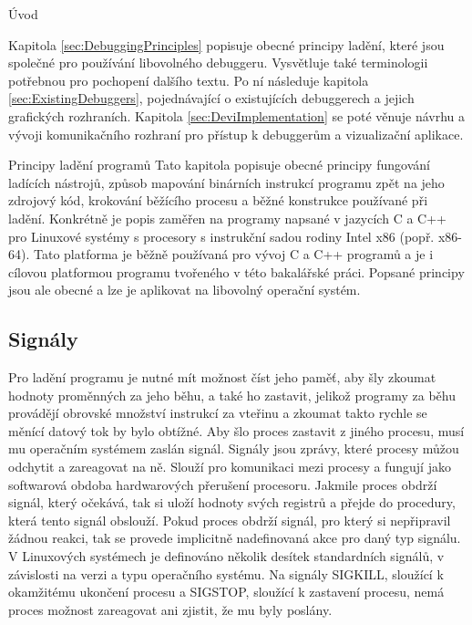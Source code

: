 \documentclass[czech,bachelor,male,python,dept460]{diploma}						%
\newcommand{\parspace}[1][]{
	\ifthenelse{\isempty{#1}}{\vspace{5mm}}{\vspace{#1}}
	\par
}
\begin{document}
\begin{section}{Úvod}
	\parspace Kapitola \ref{sec:DebuggingPrinciples} popisuje obecné principy ladění, které jsou společné pro používání libovolného debuggeru.
	Vysvětluje také terminologii potřebnou pro pochopení dalšího textu. Po ní následuje kapitola \ref{sec:ExistingDebuggers}, pojednávající o existujících
	debuggerech a jejich grafických rozhraních. Kapitola \ref{sec:DeviImplementation} se poté věnuje návrhu a vývoji komunikačního rozhraní pro přístup k debuggerům
	a vizualizační aplikace.
\end{section}
\begin{section}{Principy ladění programů}
\label{sec:DebuggingPrinciples}
	Tato kapitola popisuje obecné principy fungování ladících nástrojů, způsob mapování binárních instrukcí programu zpět na jeho zdrojový kód,
	krokování běžícího procesu a běžné konstrukce používané při ladění. Konkrétně je popis zaměřen na programy napsané v jazycích C a C++
	pro Linuxové systémy s procesory s instrukční sadou rodiny Intel x86 (popř. x86-64).
	Tato platforma je běžně používaná pro vývoj C a C++ programů a je i cílovou platformou programu tvořeného v této bakalářské práci.
	Popsané principy jsou ale obecné a lze je aplikovat na libovolný operační systém.
		
	\subsection{Signály}
		Pro ladění programu je nutné mít možnost číst jeho paměť, aby šly zkoumat hodnoty proměnných za jeho běhu, a také ho zastavit, jelikož
		programy za běhu provádějí obrovské množství instrukcí za vteřinu a zkoumat takto rychle se měnící datový tok by bylo obtížné.
		Aby šlo proces zastavit z jiného procesu, musí mu operačním systémem zaslán signál.
		Signály jsou zprávy, které procesy můžou odchytit a zareagovat na ně. \cite[21]{tanenbaum}
		Slouží pro komunikaci mezi procesy a fungují jako softwarová obdoba hardwarových přerušení procesoru.
		Jakmile proces obdrží signál, který očekává, tak si uloží hodnoty svých registrů a přejde do procedury, která tento signál obslouží.
		Pokud proces obdrží signál, pro který si nepřipravil žádnou reakci, tak se provede implicitně nadefinovaná akce pro daný typ signálu.
		V Linuxových systémech je definováno několik desítek standardních signálů, v závislosti na verzi a typu operačního systému.
		Na signály SIGKILL, sloužící k okamžitému ukončení procesu a SIGSTOP, sloužící k zastavení procesu, nemá proces možnost zareagovat ani
		zjistit, že mu byly poslány.
	

\end{section}
\end{document}
